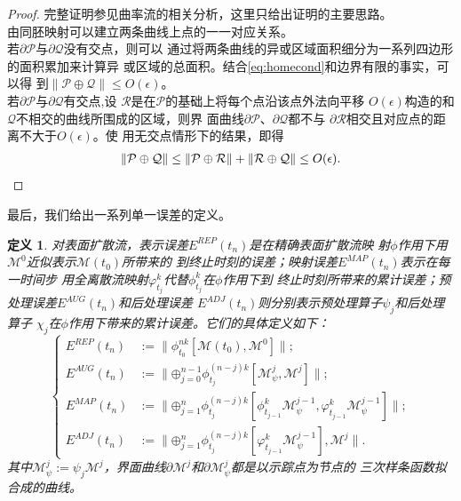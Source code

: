 \documentclass[a4paper,twoside]{ctexart}
\newtheorem{definition}{定义}[section]
\begin{document}
    \begin{proof}
      完整证明参见曲率流的相关分析，这里只给出证明的主要思路。\\
      \indent 由同胚映射可以建立两条曲线上点的一一对应关系。\\
      \indent 若$\partial \mathcal{P}$与$\partial \mathcal{Q}$没有交点，则可以
      通过将两条曲线的异或区域面积细分为一系列四边形的面积累加来计算异
      或区域的总面积。结合\eqref{eq:homecond}和边界有限的事实，可以得
      到$\|\mathcal{P} \oplus \mathcal{Q} \| \le O(\epsilon)$。\\
      \indent 若$\partial \mathcal{P}$与$\partial \mathcal{Q}$有交点,设
      $\mathcal{R}$是在$\mathcal{P}$的基础上将每个点沿该点外法向平移
      $O(\epsilon)$构造的和$\mathcal{Q}$不相交的曲线所围成的区域，则界
      面曲线$\partial \mathcal{P}$、$\partial \mathcal{Q}$都不与
      $\partial \mathcal{R}$相交且对应点的距离不大于$O(\epsilon)$。使
      用无交点情形下的结果，即得
      \begin{eqnarray}
        \label{eq:prle1}
        \|\mathcal{P} \oplus \mathcal{Q} \| \le \|\mathcal{P} \oplus
        \mathcal{R} \| + \|\mathcal{R} \oplus \mathcal{Q} \| \le
        O(\epsilon). \qedhere
      \end{eqnarray} 
    \end{proof}
  \indent 最后，我们给出一系列单一误差的定义。
  \begin{definition}
    对表面扩散流，表示误差$E^{REP}(t_n)$是在精确表面扩散流映
    射$\phi$作用下用$\mathcal{M}^0$近似表示$\mathcal{M}(t_0)$所带来的
    到终止时刻的误差；映射误差$E^{MAP}(t_n)$表示在每一时间步
    用全离散流映射$\varphi_{t_j}^k$代替$\phi_{t_j}^k$在$\phi$作用下到
    终止时刻所带来的累计误差；预处理误差$E^{AUG}(t_n)$和后处理误差
  $E^{ADJ}(t_n)$则分别表示预处理算子$\psi_j$和后处理算子
  $\chi_j$在$\phi$作用下带来的累计误差。它们的具体定义如下：
  \begin{equation}
    \label{eq:deferr}
    \left\{
\begin{aligned}
E^{REP}(t_n)&:=\|\phi_{t_0}^{nk}[\mathcal{M}(t_0),\mathcal{M}^0]\|;
    \\
  E^{AUG}(t_n)&:=\|\boldsymbol{\oplus}_{j=0}^{n-1}\phi_{t_j}^{(n-j)k}[\mathcal{M}_{\psi}^j,\mathcal{M}^j]
                   \|; \\
  E^{MAP}(t_n)&:=\|\boldsymbol{\oplus}_{j=1}^{n}\phi_{t_j}^{(n-j)k}[\phi_{t_{j-1}}^{k}\mathcal{M}_{\psi}^{j-1},\varphi_{t_{j-1}}^{k}\mathcal{M}_{\psi}^{j-1}]
                   \|; \\
  E^{ADJ}(t_n)&:=\|\boldsymbol{\oplus}_{j=1}^{n}\phi_{t_j}^{(n-j)k}[\varphi_{t_{j-1}}^{k}\mathcal{M}_{\psi}^{j-1}],\mathcal{M}^j
  \|.
\end{aligned}
\right.
  \end{equation}
  其中$\mathcal{M}_{\psi}^j:=\psi_j\mathcal{M}^j$，界面曲线$\partial
  \mathcal{M}^j$和$\partial \mathcal{M}_{\psi}^j$都是以示踪点为节点的
  三次样条函数拟合成的曲线。
  \end{definition}
\end{document}
